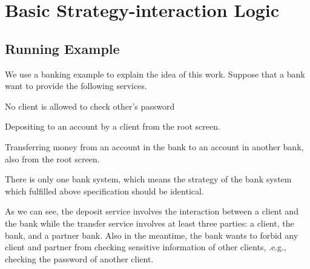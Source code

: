 \chapter{Basic Strategy-interaction Logic}
\label{c:bsil}

\section{Running Example}
We use a banking example to explain the idea of this work. 
Suppose that a bank want to provide the following services. 
\begin{list1}
\item No client is allowed to check other's password
\item Depositing to an account by a client from the root screen. 
\item Transferring money from an account in the bank to an account in another bank, also from the root screen.
\item There is only one bank system, which means the strategy of the bank system which fulfilled above specification should be identical.
\end{list1} 
As we can see, the deposit service involves the interaction between a client and the bank while the transfer service involves at least three parties: a client, the bank, and a partner bank.
Also in the meantime, the bank wants to forbid any client and partner from checking sensitive information of other clients, .e.g., checking the password of another client.  

